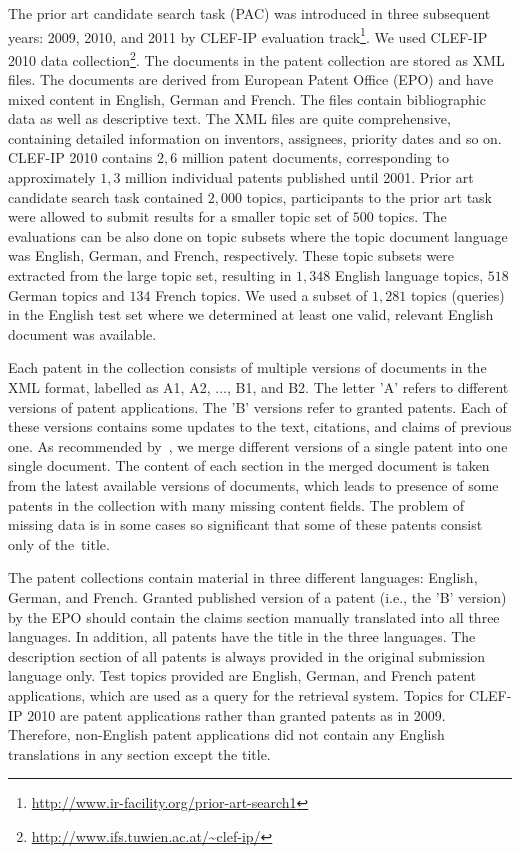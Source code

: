 The prior art candidate search task (PAC) was introduced in three subsequent years: 
2009, 2010, and 2011 by CLEF-IP evaluation track\footnote{\url{http://www.ir-facility.org/prior-art-search1}}. 
We used CLEF-IP 2010 data collection\footnote{\url{http://www.ifs.tuwien.ac.at/~clef-ip/}}. 
The documents in the patent collection are stored as XML files. The documents are derived from 
European Patent Office (EPO) and have mixed content in English, German and French.
The files contain bibliographic data as well as descriptive text. The XML files are quite comprehensive, 
containing detailed information on inventors, assignees, priority dates and so on.
CLEF-IP 2010 contains $  2,6  $ million patent documents, corresponding to approximately $ 1,3 $ 
million individual patents published until 2001. Prior art candidate search task contained $2,000$ topics, 
participants to the prior art task were allowed to submit results for a smaller topic set of $500$ topics. 
The evaluations can be also done on topic subsets where the topic document language was English, German, and French, 
respectively. These topic subsets were extracted from the large topic set, resulting in $1,348$ English language topics, 
$518$ German topics and $134$ French topics. We used a subset of $1,281$ topics (queries)
in the English test set where we determined at least one
valid, relevant English document was available.

Each patent in the collection consists of multiple versions of documents in the XML format, labelled as A1, A2, $\ldots$, B1, and B2. The letter 'A' refers to different versions of patent applications. The 'B' versions refer to granted patents. Each of these versions contains some updates to the text, citations, and claims of previous one. As recommended by~\cite{magdy2012toward}, we merge different versions of a single patent into one single document. The content of each section in the merged document is taken from the latest available versions of documents, which leads to presence of some patents in the collection with many missing content fields. The problem of missing data is in some cases so significant that some of these patents consist only of the~title.

The patent collections contain material in three different languages: English, German, and French. Granted published version of a patent (i.e., the 'B' version) by the EPO should contain the claims section manually translated into all three languages. In addition, all patents have the title in the three languages. The description section of all patents is always provided in the original submission language only.
Test topics provided are English, German, and French patent applications, which are used as a query for the retrieval system. Topics for CLEF-IP 2010 are patent applications rather than granted patents as in 2009. Therefore, non-English patent applications did not contain any English translations in any section except the title.%

